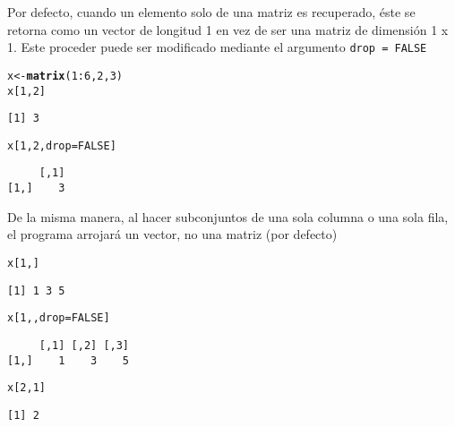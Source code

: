 \documentclass{article}\usepackage[]{graphicx}\usepackage[]{color}
\makeatletter
\newcommand{\hlnum}[1]{\textcolor[rgb]{0.686,0.059,0.569}{#1}}%
\newcommand{\hlopt}[1]{\textcolor[rgb]{0,0,0}{#1}}%
\newcommand{\hlstd}[1]{\textcolor[rgb]{0.345,0.345,0.345}{#1}}%
\newcommand{\hlkwb}[1]{\textcolor[rgb]{0.69,0.353,0.396}{#1}}%
\newcommand{\hlkwc}[1]{\textcolor[rgb]{0.333,0.667,0.333}{#1}}%
\newcommand{\hlkwd}[1]{\textcolor[rgb]{0.737,0.353,0.396}{\textbf{#1}}}%
\newenvironment{kframe}{%
 \def\at@end@of@kframe{}%
 \ifinner\ifhmode%
  \def\at@end@of@kframe{\end{minipage}}%
  \begin{minipage}{\columnwidth}%
 \fi\fi%
 \def\FrameCommand##1{\hskip\@totalleftmargin \hskip-\fboxsep
 \colorbox{shadecolor}{##1}\hskip-\fboxsep
     \hskip-\linewidth \hskip-\@totalleftmargin \hskip\columnwidth}%
 \MakeFramed {\advance\hsize-\width
   \@totalleftmargin\z@ \linewidth\hsize
   \@setminipage}}%
 {\par\unskip\endMakeFramed%
 \at@end@of@kframe}
\newenvironment{knitrout}{}{} %
\makeatother
\begin{document}
    Por defecto, cuando un elemento solo de una matriz es recuperado, éste se retorna como un vector de longitud 1 en vez de ser una matriz de dimensión 1 x 1. Este proceder puede ser modificado mediante el argumento \texttt{drop = FALSE}
\begin{knitrout}
\color{fgcolor}\begin{kframe}
\begin{alltt}
  \hlstd{x} \hlkwb{<-} \hlkwd{matrix}\hlstd{(}\hlnum{1}\hlopt{:}\hlnum{6}\hlstd{,} \hlnum{2}\hlstd{,} \hlnum{3}\hlstd{)}
  \hlstd{x[}\hlnum{1}\hlstd{,} \hlnum{2}\hlstd{]}
\end{alltt}
\begin{verbatim}
[1] 3
\end{verbatim}
\begin{alltt}
  \hlstd{x[}\hlnum{1}\hlstd{,} \hlnum{2}\hlstd{,} \hlkwc{drop} \hlstd{=} \hlnum{FALSE}\hlstd{]}
\end{alltt}
\begin{verbatim}
     [,1]
[1,]    3
\end{verbatim}
\end{kframe}
\end{knitrout}

    De la misma manera, al hacer subconjuntos de una sola columna o una sola fila, el programa arrojará un vector, no una matriz (por defecto)
\begin{knitrout}
\color{fgcolor}\begin{kframe}
\begin{alltt}
  \hlstd{x[}\hlnum{1}\hlstd{, ]}
\end{alltt}
\begin{verbatim}
[1] 1 3 5
\end{verbatim}
\begin{alltt}
  \hlstd{x[}\hlnum{1}\hlstd{, ,} \hlkwc{drop} \hlstd{=} \hlnum{FALSE}\hlstd{]}
\end{alltt}
\begin{verbatim}
     [,1] [,2] [,3]
[1,]    1    3    5
\end{verbatim}
\begin{alltt}
  \hlstd{x[}\hlnum{2}\hlstd{,}\hlnum{1}\hlstd{]}
\end{alltt}
\begin{verbatim}
[1] 2
\end{verbatim}
\end{kframe}
\end{knitrout}
\end{document}
